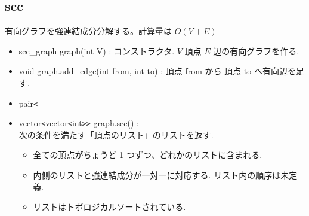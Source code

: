 \subsection{scc}

有向グラフを強連結成分分解する。計算量は $O(V + E)$
\begin{itemize}
    \item scc\_graph graph(int V) : コンストラクタ. $V$ 頂点 $E$ 辺の有向グラフを作る.
    \item void graph.add\_edge(int from, int to) : 頂点 from から 頂点 to へ有向辺を足す.
    \item pair\verb|<|
    \item vector\verb|<|vector\verb|<|int\verb|>>|  graph.scc() : \\ 次の条件を満たす「頂点のリスト」のリストを返す.
    \begin{itemize}
        \item 全ての頂点がちょうど 1 つずつ、どれかのリストに含まれる.
        \item 内側のリストと強連結成分が一対一に対応する. リスト内の順序は未定義.
        \item リストはトポロジカルソートされている.
    \end{itemize}
\end{itemize}


